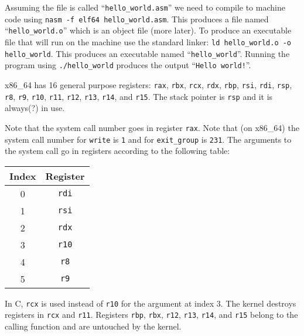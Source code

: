Assuming the file is called ``\texttt{hello_world.asm}'' we need to
compile to machine code using \texttt{nasm -f elf64
  hello_world.asm}. This produces a file named
``\texttt{hello_world.o}'' which is an object file (more later). To
produce an executable file that will run on the machine use the standard linker:
\texttt{ld hello_world.o -o hello_world}. This produces an
executable named ``\texttt{hello_world}''. Running the program
using \texttt{./hello_world} produces the output
``\texttt{Hello world!}''.

x86\_64 has 16 general purpose registers: \texttt{rax},
\texttt{rbx}, \texttt{rcx}, \texttt{rdx},
\texttt{rbp}, \texttt{rsi}, \texttt{rdi},
\texttt{rsp}, \texttt{r8}, \texttt{r9},
\texttt{r10}, \texttt{r11}, \texttt{r12},
\texttt{r13}, \texttt{r14}, and \texttt{r15}. The
stack pointer is \texttt{rsp} and it is always(?) in use.

Note that the system call number goes in register \texttt{rax}. Note
that (on x86\_64) the system call number for \texttt{write} is
\texttt{1} and for \texttt{exit_group} is \texttt{231}. The arguments
to the system call go in registers according to the following table:

{\ttfamily\begin{tabular}{c c}
  \hline
  Index & Register \\
  \hline
  0 & \texttt{rdi} \\
  1 & \texttt{rsi} \\
  2 & \texttt{rdx} \\
  3 & \texttt{r10} \\
  4 & \texttt{r8} \\
  5 & \texttt{r9} \\
\end{tabular}}

In C, \texttt{rcx} is used instead of \texttt{r10} for the
argument at index 3. The kernel destroys registers in \texttt{rcx} and
\texttt{r11}. Registers \texttt{rbp}, \texttt{rbx},
\texttt{r12}, \texttt{r13}, \texttt{r14}, and
\texttt{r15} belong to the calling function and are untouched by the
kernel.
